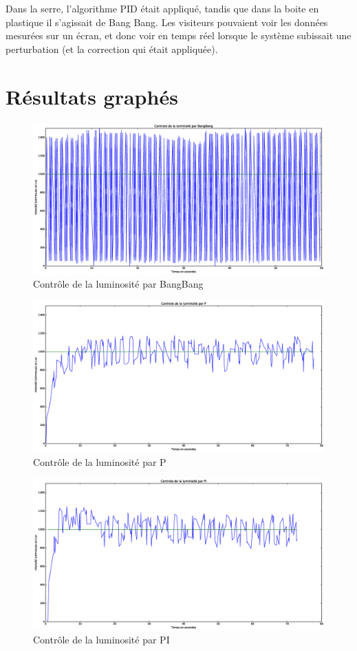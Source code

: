 \documentclass[a4paper,10pt]{report}
\begin{document}
Dans la serre, l'algorithme PID était appliqué, tandis que dans la boite en plastique il s'agissait de Bang Bang. Les visiteurs pouvaient voir les données mesurées sur un écran, et donc voir en temps réel lorsque le système subissait une perturbation (et la correction qui était appliquée).

\chapter{Résultats graphés}

\begin{figure}[htb!]
   \centering
   \includegraphics[scale=0.35]{BangBang.eps}
   \caption{\label{fig:bangbang} Contrôle de la luminosité par BangBang}
\end{figure}

\begin{figure}[htb!]
   \centering
   \includegraphics[scale=0.35]{P.eps}
   \caption{\label{fig:p} Contrôle de la luminosité par P}
\end{figure}

\begin{figure}[htb!]
   \centering
   \includegraphics[scale=0.35]{PI.eps}
   \caption{\label{fig:pi} Contrôle de la luminosité par PI}
\end{figure}
\end{document}
